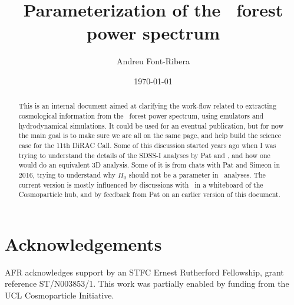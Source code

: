 \documentclass[preprintnumbers,prd,superscriptaddress,notitlepage,nofootinbib] {revtex4-1}
\begin{document}
\title{Parameterization of the \lya\ forest power spectrum}

\author{Andreu Font-Ribera} %

\date{\today}

\begin{abstract}
This is an internal document aimed at clarifying the work-flow related to extracting cosmological information 
from the \lya\ forest power spectrum, using emulators and hydrodynamical simulations.
It could be used for an eventual publication, but for now the main goal is to make sure we are all on the
same page, and help build the science case for the 11th DiRAC Call.
Some of this discussion started years ago when I was trying to understand the details of the SDSS-I analyses
by Pat and \uros, and how one would do an equivalent 3D analysis. 
Some of it is from chats with Pat and Simeon in 2016, trying to understand why $H_0$ should not be a
parameter in \lya\ analyses. 
The current version is mostly influenced by discussions with \anze\ in a whiteboard of the Cosmoparticle hub,
and by feedback from Pat on an earlier version of this document.
\end{abstract}

\maketitle













\section*{Acknowledgements}
AFR acknowledges support by an STFC Ernest Rutherford Fellowship, grant reference ST/N003853/1.
This work was partially enabled by funding from the UCL Cosmoparticle
Initiative.




\appendix

\newpage

\newpage

\end{document}
